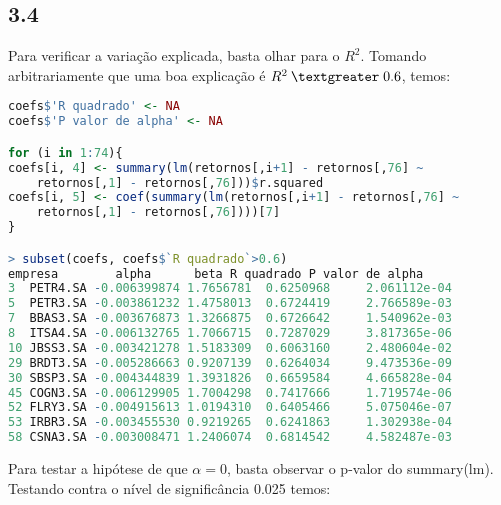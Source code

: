\documentclass[12pt]{article}
\begin{document}
\subsection*{3.4}
Para verificar a variação explicada, basta olhar para o $R^2$. Tomando arbitrariamente que uma boa explicação é $R^2\:\textgreater \;0.6$, temos:

\begin{lstlisting}[language=R]
coefs$'R quadrado' <- NA
coefs$'P valor de alpha' <- NA

for (i in 1:74){
coefs[i, 4] <- summary(lm(retornos[,i+1] - retornos[,76] ~ 
	retornos[,1] - retornos[,76]))$r.squared
coefs[i, 5] <- coef(summary(lm(retornos[,i+1] - retornos[,76] ~ 
	retornos[,1] - retornos[,76])))[7]
}

> subset(coefs, coefs$`R quadrado`>0.6)
empresa        alpha      beta R quadrado P valor de alpha
3  PETR4.SA -0.006399874 1.7656781  0.6250968     2.061112e-04
5  PETR3.SA -0.003861232 1.4758013  0.6724419     2.766589e-03
7  BBAS3.SA -0.003676873 1.3266875  0.6726642     1.540962e-03
8  ITSA4.SA -0.006132765 1.7066715  0.7287029     3.817365e-06
10 JBSS3.SA -0.003421278 1.5183309  0.6063160     2.480604e-02
29 BRDT3.SA -0.005286663 0.9207139  0.6264034     9.473536e-09
30 SBSP3.SA -0.004344839 1.3931826  0.6659584     4.665828e-04
45 COGN3.SA -0.006129905 1.7004298  0.7417666     1.719574e-06
52 FLRY3.SA -0.004915613 1.0194310  0.6405466     5.075046e-07
53 IRBR3.SA -0.003455530 0.9219265  0.6241863     1.302938e-04
58 CSNA3.SA -0.003008471 1.2406074  0.6814542     4.582487e-03
\end{lstlisting}
Para testar a hipótese de que $\alpha=0$, basta observar o p-valor do summary(lm). Testando contra o nível de significância 0.025 temos:
\end{document}
